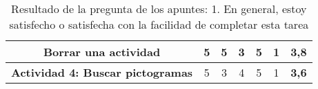 \begin{table}[H]
{\begin{tabular}{c|cccccc|}
            \multicolumn{1}{|c|}{\textbf{Borrar una actividad}}            & \multicolumn{1}{c|}{5}                                                                                              & \multicolumn{1}{c|}{5}                  & \multicolumn{1}{c|}{3}                  & \multicolumn{1}{c|}{5}                  & \multicolumn{1}{c|}{1}                  & \textbf{3,8}   \\ \hline
            \multicolumn{1}{|c|}{\textbf{Actividad 4: Buscar pictogramas}} & \multicolumn{1}{c|}{5}                                                                                              & \multicolumn{1}{c|}{3}                  & \multicolumn{1}{c|}{4}                  & \multicolumn{1}{c|}{5}                  & \multicolumn{1}{c|}{1}                  & \textbf{3,6}   \\ \hline
        \end{tabular}%
    }
    \caption{Resultado de la pregunta de los apuntes: 1. En general, estoy satisfecho o satisfecha con la facilidad de completar esta tarea}
    \label{tab:pregunta1Apunte}
\end{table}

